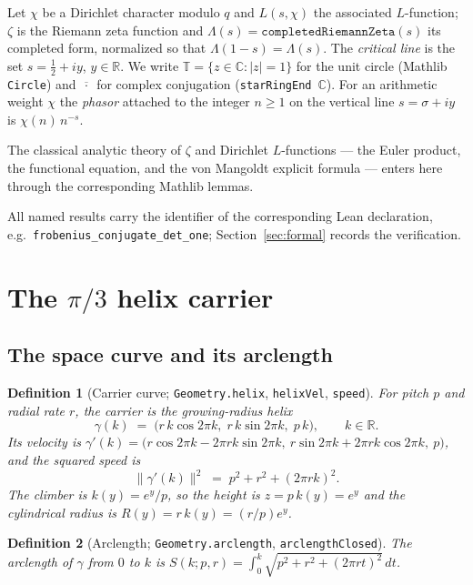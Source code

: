 \documentclass[11pt]{article}
\newtheorem{definition}{Definition}[section]
\newcommand{\C}{\mathbb{C}}
\newcommand{\R}{\mathbb{R}}
\newcommand{\T}{\mathbb{T}}
\newcommand{\conj}[1]{\overline{#1}}
\newcommand{\code}[1]{\texttt{#1}}
\begin{document}
Let $\chi$ be a Dirichlet character modulo $q$ and $L(s,\chi)$ the associated $L$-function;
$\zeta$ is the Riemann zeta function and $\Lambda(s)=\code{completedRiemannZeta}(s)$ its completed
form, normalized so that $\Lambda(1-s)=\Lambda(s)$. The \emph{critical line} is the set
$s=\tfrac12+iy$, $y\in\R$. We write $\T=\{z\in\C:|z|=1\}$ for the unit circle (Mathlib
\code{Circle}) and $\conj{\,\cdot\,}$ for complex conjugation (\code{starRingEnd}~$\C$). For an
arithmetic weight $\chi$ the \emph{phasor} attached to the integer $n\ge 1$ on the vertical line
$s=\sigma+iy$ is $\chi(n)\,n^{-s}$.

The classical analytic theory of $\zeta$ and Dirichlet $L$-functions --- the Euler product, the
functional equation, and the von Mangoldt explicit formula
\cite{Riemann1859,Edwards1974,Titchmarsh1986,Davenport2000,IwaniecKowalski2004,MontgomeryVaughan2007}
--- enters here through the corresponding Mathlib lemmas.

All named results carry the identifier of the corresponding Lean declaration, e.g.\
\code{frobenius\_conjugate\_det\_one}; Section~\ref{sec:formal} records the verification.

\section{The $\pi/3$ helix carrier}\label{sec:carrier}

\subsection{The space curve and its arclength}

\begin{definition}[Carrier curve; \code{Geometry.helix}, \code{helixVel}, \code{speed}]\label{def:helix}
For pitch $p$ and radial rate $r$, the carrier is the growing-radius helix
\[
  \gamma(k) \;=\; \bigl(r\,k\cos 2\pi k,\; r\,k\sin 2\pi k,\; p\,k\bigr),\qquad k\in\R .
\]
Its velocity is $\gamma'(k)=\bigl(r\cos2\pi k-2\pi r k\sin2\pi k,\ r\sin2\pi k+2\pi r k\cos2\pi k,\ p\bigr)$,
and the squared speed is
\[
  \|\gamma'(k)\|^2 \;=\; p^2+r^2+(2\pi r k)^2 .
\]
The \emph{climber} is $k(y)=e^{y}/p$, so the height is $z=p\,k(y)=e^{y}$ and the cylindrical radius
is $R(y)=r\,k(y)=(r/p)e^{y}$.
\end{definition}

\begin{definition}[Arclength; \code{Geometry.arclength}, \code{arclengthClosed}]\label{def:arclength}
The arclength of $\gamma$ from $0$ to $k$ is
$\displaystyle S(k;p,r)=\int_0^k\sqrt{p^2+r^2+(2\pi r t)^2}\,dt$.
\end{definition}
\end{document}
